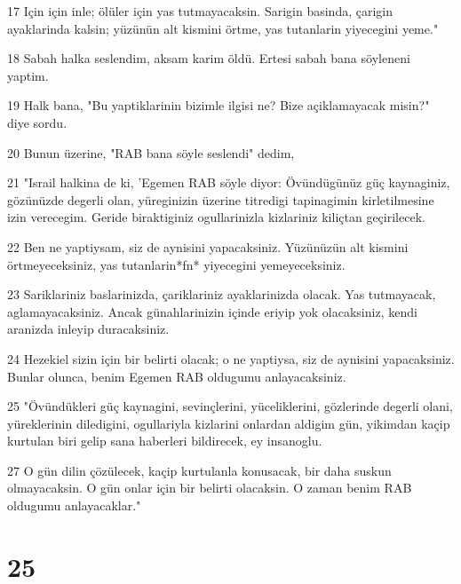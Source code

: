 \par 17 Için için inle; ölüler için yas tutmayacaksin. Sarigin basinda, çarigin ayaklarinda kalsin; yüzünün alt kismini örtme, yas tutanlarin yiyecegini yeme."
\par 18 Sabah halka seslendim, aksam karim öldü. Ertesi sabah bana söyleneni yaptim.
\par 19 Halk bana, "Bu yaptiklarinin bizimle ilgisi ne? Bize açiklamayacak misin?" diye sordu.
\par 20 Bunun üzerine, "RAB bana söyle seslendi" dedim,
\par 21 "Israil halkina de ki, 'Egemen RAB söyle diyor: Övündügünüz güç kaynaginiz, gözünüzde degerli olan, yüreginizin üzerine titredigi tapinagimin kirletilmesine izin verecegim. Geride biraktiginiz ogullarinizla kizlariniz kiliçtan geçirilecek.
\par 22 Ben ne yaptiysam, siz de aynisini yapacaksiniz. Yüzünüzün alt kismini örtmeyeceksiniz, yas tutanlarin*fn* yiyecegini yemeyeceksiniz.
\par 23 Sariklariniz baslarinizda, çariklariniz ayaklarinizda olacak. Yas tutmayacak, aglamayacaksiniz. Ancak günahlarinizin içinde eriyip yok olacaksiniz, kendi aranizda inleyip duracaksiniz.
\par 24 Hezekiel sizin için bir belirti olacak; o ne yaptiysa, siz de aynisini yapacaksiniz. Bunlar olunca, benim Egemen RAB oldugumu anlayacaksiniz.
\par 25 "Övündükleri güç kaynagini, sevinçlerini, yüceliklerini, gözlerinde degerli olani, yüreklerinin diledigini, ogullariyla kizlarini onlardan aldigim gün, yikimdan kaçip kurtulan biri gelip sana haberleri bildirecek, ey insanoglu.
\par 27 O gün dilin çözülecek, kaçip kurtulanla konusacak, bir daha suskun olmayacaksin. O gün onlar için bir belirti olacaksin. O zaman benim RAB oldugumu anlayacaklar."

\chapter{25}

